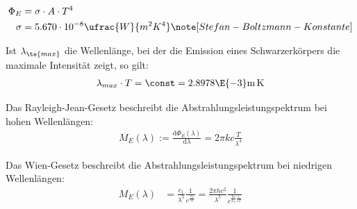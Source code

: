 \documentclass[twocolumn]{summery}
\begin{document}
\begin{lemma}
    \begin{align*}
        \Phi_E &= \sigma \cdot A \cdot T^4\\
        \sigma &= 5.670 \cdot10^{-8} \ufrac{W}{m^2K^4}\note[Stefan-Boltzmann-Konstante]
    \end{align*}
\end{lemma}

\begin{lemma}
    Ist \(\lambda_{\te{max}}\) die Wellenlänge, bei der die Emission eines Schwarzerkörpers
    die maximale Intensität zeigt, so gilt:
    \begin{align*}
        \lambda_{max}\cdot T = \const = 2.8978 \E{-3} \mathrm{m\, K}
    \end{align*}
\end{lemma}

\begin{lemma}
    Das Rayleigh-Jean-Gesetz beschreibt die Abstrahlungsleistungspektrum bei hohen Wellenlängen:
    \begin{align*}
        M_E(\lambda):= \frac{\mathrm  d \Phi_E(\lambda)}{\mathrm d\lambda}=2\pi k c\frac T{\lambda^4}
    \end{align*}
\end{lemma}

\begin{lemma}
    Das Wien-Gesetz beschreibt die Abstrahlungsleistungspektrum bei niedrigen Wellenlängen:
    \begin{align*}
        M_E(\lambda) &= \frac{c_1}{\lambda^5} \frac{1}{e^{\frac{c_2}{\lambda T}}}
        = \frac{2\pi h c^2}{\lambda^5} \frac{1}{e^{\frac{h c}{k_B}\frac{1}{\lambda T}}}
    \end{align*}
\end{lemma}
\end{document}
